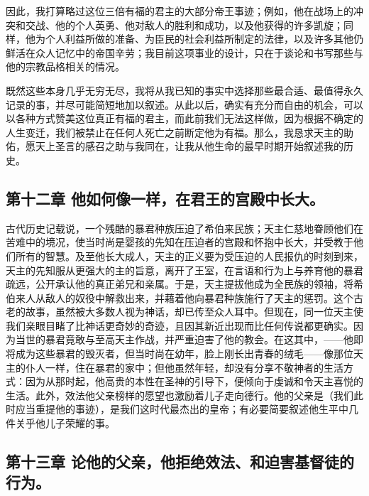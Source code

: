 因此，我打算略过这位三倍有福的君主的大部分帝王事迹；例如，他在战场上的冲突和交战、他的个人英勇、他对敌人的胜利和成功，以及他获得的许多凯旋；同样，他为个人利益所做的准备、为臣民的社会利益所制定的法律，以及许多其他仍鲜活在众人记忆中的帝国辛劳；我目前这项事业的设计，只在于谈论和书写那些与他的宗教品格相关的情况。\par

既然这些本身几乎无穷无尽，我将从我已知的事实中选择那些最合适、最值得永久记录的事，并尽可能简短地加以叙述。从此以后，确实有充分而自由的机会，可以以各种方式赞美这位真正有福的君主，而此前我们无法这样做，因为根据不确定的人生变迁，我们被禁止在任何人死亡之前断定他为有福。那么，我恳求天主的助佑，愿天上圣言的感召之助与我同在，让我从他生命的最早时期开始叙述我的历史。\par


\subsection{第十二章  他如何像一样，在君王的宫殿中长大。}

古代历史记载说，一个残酷的暴君种族压迫了希伯来民族；天主仁慈地眷顾他们在苦难中的境况，使当时尚是婴孩的先知在压迫者的宫殿和怀抱中长大，并受教于他们所有的智慧。及至他长大成人，天主的正义要为受压迫的人民报仇的时刻到来，天主的先知服从更强大的主的旨意，离开了王室，在言语和行为上与养育他的暴君疏远，公开承认他的真正弟兄和亲属。于是，天主提拔他成为全民族的领袖，将希伯来人从敌人的奴役中解救出来，并藉着他向暴君种族施行了天主的惩罚。这个古老的故事，虽然被大多数人视为神话，却已传至众人耳中。但现在，同一位天主使我们亲眼目睹了比神话更奇妙的奇迹，且因其新近出现而比任何传说都更确实。因为当世的暴君竟敢与至高天主作战，并严重迫害了他的教会。在这其中，——他即将成为这些暴君的毁灭者，但当时尚在幼年，脸上刚长出青春的绒毛——像那位天主的仆人一样，住在暴君的家中；但他虽然年轻，却没有分享不敬神者的生活方式：因为从那时起，他高贵的本性在圣神的引导下，便倾向于虔诚和令天主喜悦的生活。此外，效法他父亲榜样的愿望也激励着儿子走向德行。他的父亲是（我们此时应当重提他的事迹），是我们这时代最杰出的皇帝；有必要简要叙述他生平中几件关乎他儿子荣耀的事。\par


\subsection{第十三章  论他的父亲，他拒绝效法、和迫害基督徒的行为。}

